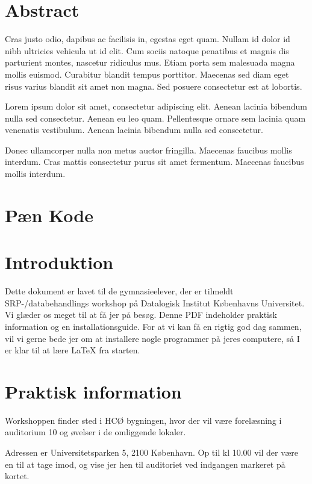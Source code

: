\documentclass{article}                                                        %
\begin{document}
\section{Abstract}
Cras justo odio, dapibus ac facilisis in, egestas eget quam. Nullam id dolor id nibh ultricies vehicula ut id elit. Cum sociis natoque penatibus et magnis dis parturient montes, nascetur ridiculus mus. Etiam porta sem malesuada magna mollis euismod. Curabitur blandit tempus porttitor. Maecenas sed diam eget risus varius blandit sit amet non magna. Sed posuere consectetur est at lobortis.

Lorem ipsum dolor sit amet, consectetur adipiscing elit. Aenean lacinia bibendum nulla sed consectetur. Aenean eu leo quam. Pellentesque ornare sem lacinia quam venenatis vestibulum. Aenean lacinia bibendum nulla sed consectetur.

Donec ullamcorper nulla non metus auctor fringilla. Maecenas faucibus mollis interdum. Cras mattis consectetur purus sit amet fermentum. Maecenas faucibus mollis interdum.


\section{Pæn Kode}

\section{Introduktion}
    Dette dokument er lavet til de gymnasieelever, der er tilmeldt
    SRP-/databehandlings workshop på Datalogisk Institut Københavns Universitet.
    Vi glæder os meget til at få jer på besøg. Denne PDF indeholder praktisk
    information og en installationsguide. For at vi kan få en rigtig god
    dag sammen, vil vi gerne bede jer om at installere nogle programmer på jeres computere, 
    så I er klar til at lære LaTeX fra starten.





\section{Praktisk information}
    Workshoppen finder sted i HCØ bygningen, hvor der vil være forelæsning i
    auditorium 10 og øvelser i de omliggende  lokaler.     
    
    Adressen er Universitetsparken 5, 2100 København.
    Op til kl 10.00 vil der være en til at tage imod, og vise jer hen til
    auditoriet ved indgangen markeret på kortet.
\end{document}
